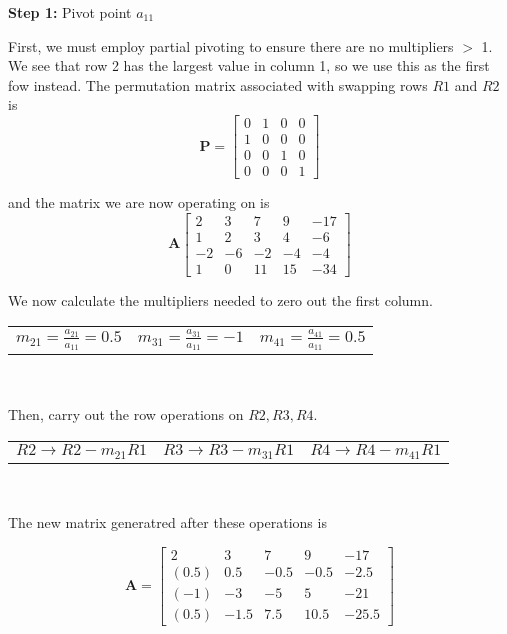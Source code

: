 \documentclass[11pt]{article}
\begin{document}
\begin{enumerate}
\begin{enumerate}[(a)]
				\textbf{Step 1:} Pivot point $a_{11}$

				First, we must employ partial pivoting to ensure there are no multipliers $>$ 1. We see that row 2 has the
				largest value in column 1, so we use this as the first fow instead. The permutation matrix associated with
				swapping rows $R1$ and $R2$ is
				\[
					\mathbf{P} =
					\begin{bmatrix}
						0 & 1 & 0 & 0 \\
						1 & 0 & 0 & 0 \\
						0 & 0 & 1 & 0 \\
						0 & 0 & 0 & 1
					\end{bmatrix}
				\]

				and the matrix we are now operating on is
				\[
					\mathbf{A}
					\begin{bmatrix}
						2 & 3 & 7 & 9 & -17 \\
						1 & 2 & 3 & 4 & -6 \\
						-2& -6 & -2 & -4 & -4 \\
						1 & 0 & 11 & 15 & -34
					\end{bmatrix}
				\]

				We now calculate the multipliers needed to zero out the first column.

				\begin{center}
				\begin{tabular}{c||c||c}

					$m_{21} = \frac{a_{21}}{a_{11}} = 0.5$ &
					$m_{31} = \frac{a_{31}}{a_{11}} = -1$ &
					$m_{41} = \frac{a_{41}}{a_{11}} = 0.5$ \\
				\end{tabular} \\
				\end{center}

				Then, carry out the row operations on $R2, R3, R4$.

				\begin{center}
				\begin{tabular}{c||c||c}

					$R2 \to R2 - m_{21}R1$ &
					$R3 \to R3 - m_{31}R1$ &
					$R4 \to R4 - m_{41}R1$ \\
				\end{tabular} \\
				\end{center}

				The new matrix generatred after these operations is

				\[
					\mathbf{A}=
					\begin{bmatrix}
						2 & 3 & 7 & 9 & -17 \\
						(0.5) & 0.5 & -0.5 & -0.5 & -2.5 \\
						(-1) & -3 & -5 & 5 & -21 \\
						(0.5) & -1.5 & 7.5 & 10.5 & -25.5
					\end{bmatrix}
				\]


\end{enumerate}
\end{enumerate}
\end{document}
